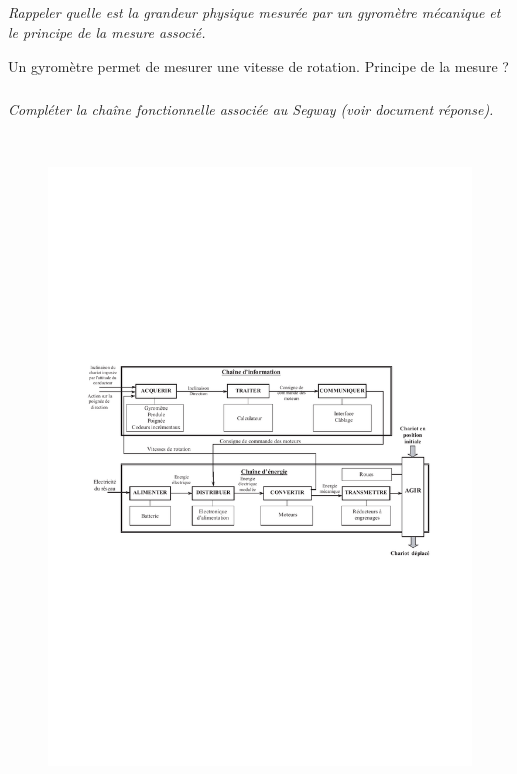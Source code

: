 \documentclass[10pt,fleqn]{article} %
\begin{document}
\subparagraph{\label{q_03}}\textit{Rappeler quelle est la grandeur physique mesurée par un gyromètre mécanique et le principe de la mesure associé.}
\ifprof
\begin{corrige}

Un gyromètre permet de mesurer une vitesse de rotation. Principe de la mesure ?
\end{corrige}
\else
\fi
%
%
%
%
\subparagraph{\label{q_04}}\textit{Compléter la chaîne fonctionnelle associée au Segway (voir document réponse).}
\ifprof
\begin{corrige} ~\\
\begin{figure}[H] 
\centering
\includegraphics[width=\linewidth]{dr_01_corr}
\end{figure}
\end{corrige}
\else
\fi
\end{document}
